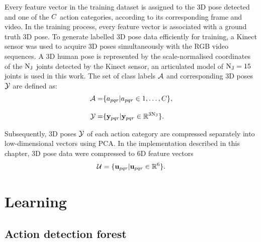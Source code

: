 Every feature vector in the training dataset is assigned to the 3D pose detected and one of the $C$ action categories, according to its corresponding frame and video. 
In the training process, every feature vector is associated with a ground truth 3D pose.
To generate labelled 3D pose data efficiently for training, a Kinect sensor was used to acquire 3D poses simultaneously with the RGB video sequences. A 3D human pose is represented by the scale-normalised coordinates of the $\mathrm{N_{J}}$ joints detected by the Kinect sensor, an articulated model of $\mathrm{N_{J}}=15$ joints is used in this work. 
The set of class labels $\mathcal{A}$ and corresponding 3D poses $\mathcal{Y}$ are defined as: 
\begin{equation}
	\begin{aligned}
		\mathcal{A} = & \{a_{pqr} | a_{pqr} \in 1,\dots,C \}, \\[3mm] 
		\mathcal{Y} = & \{\mathbf{y}_{pqr} | \mathbf{y}_{pqr} \in \mathbb{R}^{3\mathrm{N_{J}}}\}.
	\end{aligned}
\end{equation}

Subsequently, 3D poses $\mathcal{Y}$ of each action category are compressed separately into low-dimensional vectors using PCA. In the implementation described in this chapter, 3D pose data were compressed to 6D feature vectors
\begin{equation}
	\mathcal{U} = \{\mathbf{u}_{pqr}  | \mathbf{u}_{pqr} \in \mathbb{R}^{6} \}.
\end{equation}           

\section{Learning} 

\subsection{Action detection forest}
\label{sec/body/adflearn}

